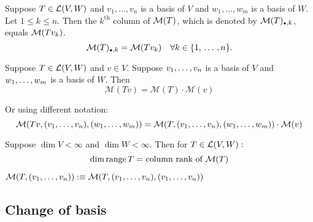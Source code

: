   \setcounter{thm}{74}
  \begin{thm} [$\mmatrix(T)_{\mathsmaller{\bullet}, k} = \mmatrix(T v_k)$]
    Suppose $T \in \mathcal{L}(V,W)$ and $v_1, \ldots, v_n$ is a basis of $V$ and $w_1, \ldots, w_m$ is a basis of $W$. Let $1\leq k \leq n$. Then the $k^{\text{th}}$ column of $\mathcal{M}(T)$, which is denoted by $\mmatrix(T)_{\mathsmaller{\bullet}, k}$, equals $\mathcal{M}(Tv_k)$.
    \begin{equation}
      \mmatrix(T)_{\mathsmaller{\bullet}, k}=\mmatrix(Tv_k) \quad \forall k \in \{1, \ddd, n\}.
    \end{equation}
  \end{thm}

  \begin{thm} 
    Suppose $T\in {\mathcal{L}(V,W)}$ and $v\in V$. Suppose $v_1, \dots, v_n$ is a basis of $V$ and $w_1, \dots, w_m$ is a basis of $W$. Then
    \begin{equation}
      \mathcal{M} (Tv)=\mathcal{M}(T) \cdot \mathcal{M}(v)
    \end{equation}

    Or using different notation:
    \begin{equation}
      \mathcal{M} (Tv, (v_1, \dots, v_n), (w_1, \dots, w_m))=\mathcal{M}(T, (v_1, \dots, v_n), (w_1, \dots, w_m)) \cdot \mathcal{M}(v)
    \end{equation}

  \end{thm}

  \setcounter{thm}{77}
  \begin{thm} 
    Suppose $\dim V < \infty$ and $\dim W < \infty$. Then for $T \in \mathcal{L}(V,W):$
    \begin{equation}
      \dim \myrange T = $ column rank of $ \mmatrix (T)
    \end{equation}
  \begin{mydef-non}
  $\mathcal{M}(T, (v_1, \dots, v_n)) :\equiv \mathcal{M}(T, (v_1, \dots, v_n),(v_1, \dots, v_n))$
\end{mydef-non}
  \end{thm}

  \subsection{Change of basis}


